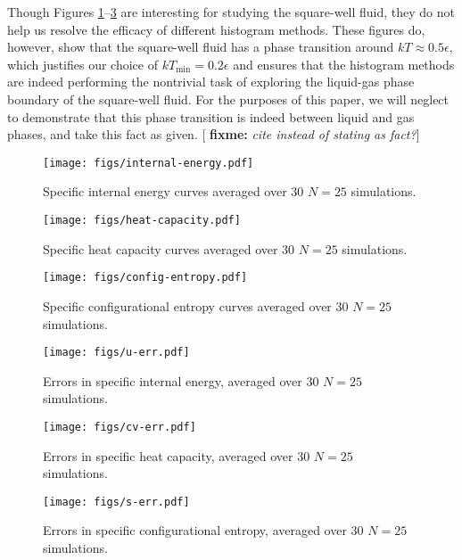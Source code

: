 \documentclass[11pt]{article}
\renewcommand{\t}{\text} %
\newcommand{\red}[1]{{\bf \color{red} #1}}
\newcommand{\fixme}[1]{[\red{fixme:} \emph{#1}]}
\begin{document}
Though Figures \ref{fig:internal_energy}--\ref{fig:config_entropy} are
interesting for studying the square-well fluid, they do not help us
resolve the efficacy of different histogram methods. These figures do,
however, show that the square-well fluid has a phase transition around
$kT\approx0.5\epsilon$, which justifies our choice of
$kT_{\t{min}}=0.2\epsilon$ and ensures that the histogram methods are
indeed performing the nontrivial task of exploring the liquid-gas
phase boundary of the square-well fluid. For the purposes of this
paper, we will neglect to demonstrate that this phase transition is
indeed between liquid and gas phases, and take this fact as
given. \fixme{cite instead of stating as fact?}

\begin{figure}[!b]
  \centering
  \texttt{[image: figs/internal-energy.pdf]}
  \caption[Internal energy]
  {Specific internal energy curves averaged over 30 $N=25$
    simulations.}
  \label{fig:internal_energy}
\end{figure}

\begin{figure}
  \centering
  \texttt{[image: figs/heat-capacity.pdf]}
  \caption[Heat capacity]
  {Specific heat capacity curves averaged over 30 $N=25$ simulations.}
  \label{fig:heat_capacity}
\end{figure}

\begin{figure}
  \centering
  \texttt{[image: figs/config-entropy.pdf]}
  \caption[Configurational entropy]
  {Specific configurational entropy curves averaged over 30 $N=25$
    simulations.}
  \label{fig:config_entropy}
\end{figure}

\begin{figure}
  \centering
  \texttt{[image: figs/u-err.pdf]}
  \caption[Internal energy error scaling]
  {Errors in specific internal energy, averaged over 30 $N=25$
    simulations.}
  \label{fig:internal_energy_err}
\end{figure}

\begin{figure}
  \centering
  \texttt{[image: figs/cv-err.pdf]}
  \caption[Heat capacity error scaling]
  {Errors in specific heat capacity, averaged over 30 $N=25$
    simulations.}
  \label{fig:heat_capacity_err}
\end{figure}

\begin{figure}
  \centering
  \texttt{[image: figs/s-err.pdf]}
  \caption[Configurational entropy error scaling]
  {Errors in specific configurational entropy, averaged over 30 $N=25$
    simulations.}
  \label{fig:config_entropy_err}
\end{figure}
\end{document}

